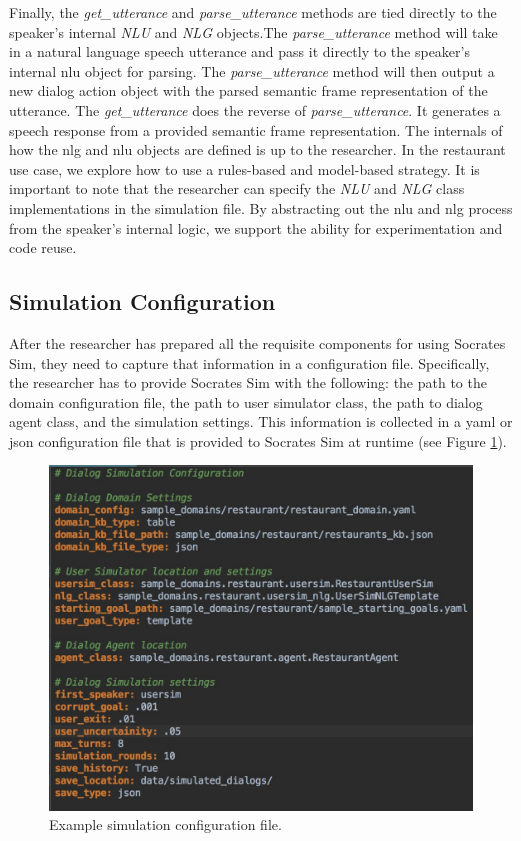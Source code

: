 Finally, the \textit{get\_utterance} and \textit{parse\_utterance} methods are tied directly to the speaker's internal \textit{NLU} and \textit{NLG} objects.The \textit{parse\_utterance} method will take in a natural language speech utterance and pass it directly to the speaker's internal nlu object for parsing. The \textit{parse\_utterance} method will then output a new dialog action object with the parsed semantic frame representation of the utterance. The \textit{get\_utterance} does the reverse of \textit{parse\_utterance}. It generates a speech response from a provided semantic frame representation. The internals of how the nlg and nlu objects are defined is up to the researcher. In the restaurant use case, we explore how to use a rules-based and model-based strategy. It is important to note that the researcher can specify the \textit{NLU} and \textit{NLG} class implementations in the simulation file. By abstracting out the nlu and nlg process from the speaker's internal logic, we support the ability for experimentation and code reuse. 

\subsection{Simulation Configuration}
After the researcher has prepared all the requisite components for using Socrates Sim, they need to capture that information in a configuration file.  Specifically, the researcher has to provide Socrates Sim with the following: the path to the domain configuration file, the path to user simulator class, the path to dialog agent class, and the simulation settings. This information is collected in a yaml or json configuration file that is provided to Socrates Sim at runtime (see Figure \ref{fig:sample_sim_config}). 

\begin{figure}[h!]
	\centering
	\includegraphics[scale=.25]{diagrams/sample_sim_config.jpeg}
	\caption{ Example simulation configuration file. }
	\label{fig:sample_sim_config}
\end{figure}


